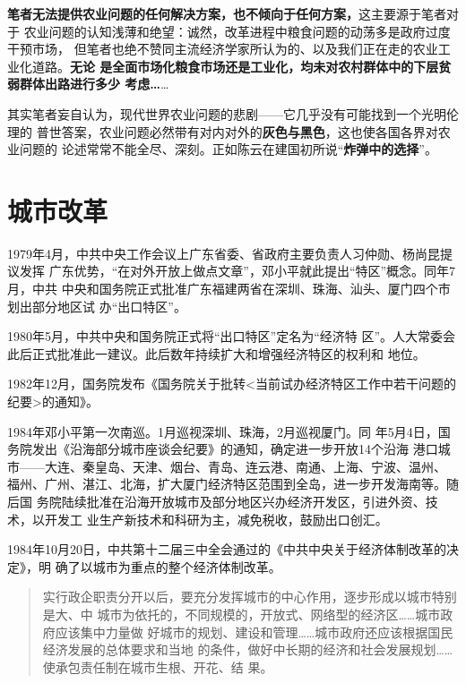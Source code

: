 \textbf{笔者无法提供农业问题的任何解决方案，也不倾向于任何方案，}这主要源于笔者对于
农业问题的认知浅薄和绝望：诚然，改革进程中粮食问题的动荡多是政府过度干预市场，
但笔者也绝不赞同主流经济学家所认为的、以及我们正在走的农业工业化道路。\textbf{无论
  是全面市场化粮食市场还是工业化，均未对农村群体中的下层贫弱群体出路进行多少
  考虑…}…

其实笔者妄自认为，现代世界农业问题的悲剧——它几乎没有可能找到一个光明伦理的
普世答案，农业问题必然带有对内对外的\textbf{灰色与黑色}，这也使各国各界对农业问题的
论述常常不能全尽、深刻。正如陈云在建国初所说“\textbf{炸弹中的选择}”。





\section{城市改革}

1979年4月，中共中央工作会议上广东省委、省政府主要负责人习仲勋、杨尚昆提议发挥
广东优势，“在对外开放上做点文章”，邓小平就此提出“特区”概念。同年7月，中共
中央和国务院正式批准广东福建两省在深圳、珠海、汕头、厦门四个市划出部分地区试
办“出口特区”。

1980年5月，中共中央和国务院正式将“出口特区”定名为“经济特
区”。人大常委会此后正式批准此一建议。此后数年持续扩大和增强经济特区的权利和
地位。

1982年12月，国务院发布《国务院关于批转<当前试办经济特区工作中若干问题的
纪要>的通知》。

1984年邓小平第一次南巡。1月巡视深圳、珠海，2月巡视厦门。同
年5月4日，国务院发出《沿海部分城市座谈会纪要》的通知，确定进一步开放14个沿海
港口城市——大连、秦皇岛、天津、烟台、青岛、连云港、南通、上海、宁波、温州、
福州、广州、湛江、北海，扩大厦门经济特区范围到全岛，进一步开发海南等。随后国
务院陆续批准在沿海开放城市及部分地区兴办经济开发区，引进外资、技术，以开发工
业生产新技术和科研为主，减免税收，鼓励出口创汇。


1984年10月20日，中共第十二届三中全会通过的《中共中央关于经济体制改革的决定》，明
确了以城市为重点的整个经济体制改革。
\begin{quotation}
  实行政企职责分开以后，要充分发挥城市的中心作用，逐步形成以城市特别是大、中
  城市为依托的，不同规模的，开放式、网络型的经济区……城市政府应该集中力量做
  好城市的规划、建设和管理……城市政府还应该根据国民经济发展的总体要求和当地
  的条件，做好中长期的经济和社会发展规划……使承包责任制在城市生根、开花、结
  果。
\end{quotation}

